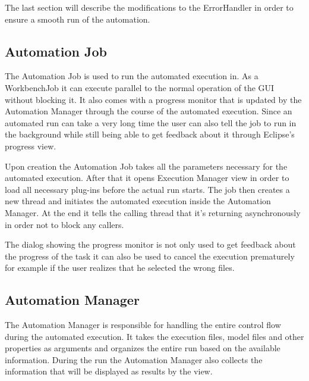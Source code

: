 The last section will describe the modifications to the ErrorHandler in order to ensure a smooth
run of the automation.

\subsection{Automation Job}
\label{section:AutomationJob}
The Automation Job is used to run the automated execution in. As a WorkbenchJob it can execute parallel
to the normal operation of the \ac{GUI} without blocking it. It also comes with a progress monitor that
is updated by the Automation Manager through the course of the automated execution. Since an automated run
can take a very long time the user can also tell the job to run in the background while still being able
to get feedback about it through Eclipse's progress view.

Upon creation the Automation Job takes all the parameters necessary for the automated execution. After that
it opens Execution Manager view in order to load all necessary plug-ins before the actual run starts. 
The job then creates a new thread and initiates the automated execution inside the Automation Manager.
At the end it tells the calling thread that it's returning asynchronously in order not to block any callers.

The dialog showing the progress monitor is not only used to get feedback about the progress of the task
it can also be used to cancel the execution prematurely for example if the user realizes that he selected
the wrong files.

\subsection{Automation Manager}
\label{section:AutomationManager}
The Automation Manager is responsible for handling the entire control flow during the automated execution.
It takes the execution files, model files and other properties as arguments and organizes the entire
run based on the available information. During the run the Automation Manager also collects the information
that will be displayed as results by the view.

